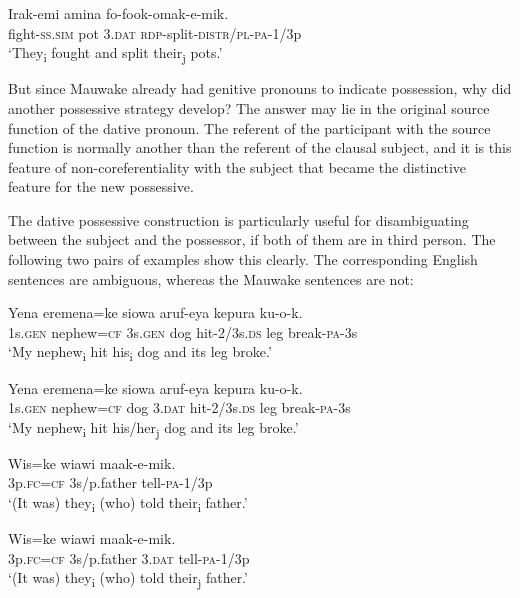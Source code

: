 \ea%
\label{ex:x1792}
\gll Irak-emi amina  fo-fook-omak-e-mik. \\
fight-\textsc{ss}.\textsc{sim} pot 3.\textsc{dat} \textsc{rdp}-split-\textsc{distr}/\textsc{pl}-\textsc{pa}-1/3p\\
\glt`They\textsubscript{i} fought and split their\textsubscript{j} pots.'
\z

But since Mauwake already had genitive pronouns to indicate possession, why did another possessive strategy develop? The answer may lie in the original source function of the dative pronoun. The referent of the participant with the source function is normally another than the referent of the clausal subject, and it is this feature of non-coreferentiality with the subject that became the distinctive feature for the new possessive. 

The dative possessive construction is particularly useful for disambiguating between the subject and the possessor, if both of them are in third person. The following two pairs of examples show this clearly. The corresponding English sentences are ambiguous, whereas the Mauwake sentences are not: 

\ea%
\label{ex:x1797}
\gll Yena eremena=ke   siowa aruf-eya kepura ku-o-k. \\
1s.\textsc{gen} nephew=\textsc{cf} 3s.\textsc{gen} dog hit-2/3s.\textsc{ds} leg break-\textsc{pa}-3s\\
\glt`My nephew\textsubscript{i} hit his\textsubscript{i} dog and its leg broke.'
\z

\ea%
\label{ex:x1796}
\gll Yena eremena=ke siowa  aruf-eya kepura ku-o-k. \\
1s.\textsc{gen} nephew=\textsc{cf} dog 3.\textsc{dat} hit-2/3s.\textsc{ds} leg break-\textsc{pa}-3s\\
\glt`My nephew\textsubscript{i} hit his/her\textsubscript{j} dog and its leg broke.'
\z

\ea%
\label{ex:x1798}
\gll Wis=ke wiawi maak-e-mik. \\
3p.\textsc{fc}=\textsc{cf} 3s/p.father tell-\textsc{pa}-1/3p\\
\glt`(It was) they\textsubscript{i} (who) told their\textsubscript{i} father.'
\z

\ea%
\label{ex:x1799}
\gll Wis=ke wiawi  maak-e-mik. \\
3p.\textsc{fc}=\textsc{cf} 3s/p.father 3.\textsc{dat} tell-\textsc{pa}-1/3p\\
\glt`(It was) they\textsubscript{i} (who) told their\textsubscript{j} father.'
\z

